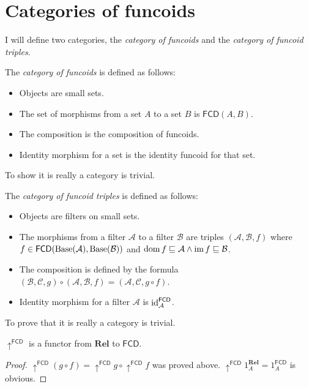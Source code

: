 \section{Categories of funcoids}

I will define two categories, the \emph{category of funcoids} and
the \emph{category of funcoid triples}.

The \emph{category of funcoids} is defined
as follows:
\begin{itemize}
\item Objects are small sets.
\item The set of morphisms from a set $A$ to a set $B$ is $\mathsf{FCD}(A,B)$.
\item The composition is the composition of funcoids.
\item Identity morphism for a set is the identity funcoid for that set.
\end{itemize}
To show it is really a category is trivial.

The \emph{category of funcoid
triples} is defined as follows:
\begin{itemize}
\item Objects are filters on small sets.
\item The morphisms from a filter $\mathcal{A}$ to a filter $\mathcal{B}$
are triples $(\mathcal{A},\mathcal{B},f)$ where
$f\in\mathsf{FCD}(\operatorname{Base}(\mathcal{A}),\operatorname{Base}(\mathcal{B}))$
and $\operatorname{dom} f\sqsubseteq\mathcal{A}\land\operatorname{im} f\sqsubseteq\mathcal{B}$.
\item The composition is defined by the formula
$(\mathcal{B},\mathcal{C},g)\circ(\mathcal{A},\mathcal{B},f)=(\mathcal{A}
,\mathcal{C},g\circ f)$.
\item Identity morphism for a filter $\mathcal{A}$ is
$\operatorname{id}_{\mathcal{A}}^{\mathsf{FCD}}$.
\end{itemize}
To prove that it is really a category is trivial.
\begin{prop}
$\uparrow^{\mathsf{FCD}}$ is a functor from $\mathbf{Rel}$ to
$\mathsf{FCD}$.\end{prop}
\begin{proof}
$\uparrow^{\mathsf{FCD}}(g\circ
f)=\uparrow^{\mathsf{FCD}}g\circ\uparrow^{\mathsf{FCD}}f$
was proved above.
$\uparrow^{\mathsf{FCD}}1_{A}^{\mathbf{Rel}}=1_{A}^{\mathsf{FCD}}$
is obvious.
\end{proof}

